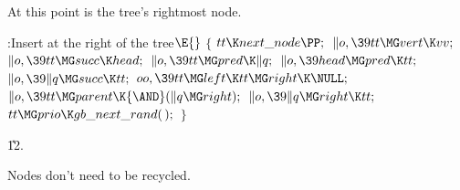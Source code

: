 At this point  is the tree's rightmost
node.

\Y\B\4:Insert  at the right of the tree\X${}\E{}$\6
${}\{{}$\1\6
${}\\{tt}\K\\{next\_node}\PP;{}$\6
${}\|o,\39\\{tt}\MG\\{vert}\K\\{vv};{}$\6
${}\|o,\39\\{tt}\MG\\{succ}\K\\{head};{}$\6
${}\|o,\39\\{tt}\MG\\{pred}\K\|q;{}$\6
${}\|o,\39\\{head}\MG\\{pred}\K\\{tt};{}$\6
${}\|o,\39\|q\MG\\{succ}\K\\{tt};{}$\6
${}\\{oo},\39\\{tt}\MG\\{left}\K\\{tt}\MG\\{right}\K\NULL;{}$\6
${}\|o,\39\\{tt}\MG\\{parent}\K{\AND}(\|q\MG\\{right});{}$\6
${}\|o,\39\|q\MG\\{right}\K\\{tt};{}$\6
${}\\{tt}\MG\\{prio}\K\\{gb\_next\_rand}(\,);{}$\6
\4${}\}{}$\2\par
\U12.\fi

Nodes don't need to be recycled.

